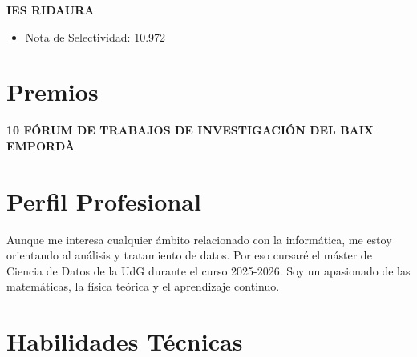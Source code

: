 \documentclass[11pt,a4paper]{article}
\newcommand{\runsubsection}[1]{\color{subheadings}\fontsize{12pt}{12pt}\selectfont\bfseries\uppercase{#1}\normalfont}
\newcommand{\descript}[1]{\color{subheadings}\raggedright\scshape\fontsize{11pt}{13pt}\selectfont{#1 \\}\normalfont}
\newcommand{\location}[1]{\color{headings}\raggedright\fontsize{10pt}{12pt}\selectfont{#1\\}\normalfont}
\newcommand{\sectionsep}{\vspace{8pt}}
\newenvironment{tightemize}{\vspace{-\topsep}\begin{itemize}\itemsep1pt \parskip0pt \parsep0pt}{\end{itemize}\vspace{-\topsep}}
\begin{document}
\begin{multicols}{2}
\runsubsection{IES Ridaura}
\descript{Bachillerato Científico}
\location{2019 – 2021 | Castell-Platja d'Aro}
\sectionsep
\begin{tightemize}
\item Nota de Selectividad: 10.972
\end{tightemize}

\sectionsep

\section{Premios}

\runsubsection{10\textordmasculine{} Fórum de Trabajos de Investigación del Baix Empordà}

\descript{Plaques solars fotovoltaiques, Seguiment solar per millorar-ne el rendiment}
\location{2021 | Girona}
\sectionsep




\columnbreak

\section{Perfil Profesional}
Aunque me interesa cualquier ámbito relacionado con la informática, me estoy orientando al análisis y tratamiento de datos. Por eso cursaré el máster de Ciencia de Datos de la UdG durante el curso 2025-2026. Soy un apasionado de las matemáticas, la física teórica y el aprendizaje continuo. 

\sectionsep

\section{Habilidades Técnicas}


\end{multicols}
\end{document}
